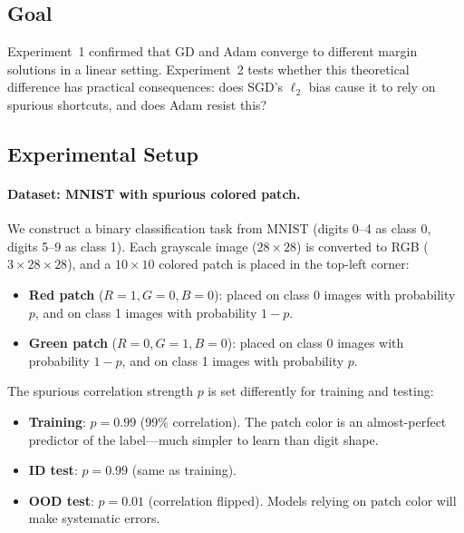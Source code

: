 \documentclass{article}
\begin{document}
\subsection{Goal}

Experiment~1 confirmed that GD and Adam converge to different margin solutions in a linear setting. Experiment~2 tests whether this theoretical difference has practical consequences: does SGD's $\ell_2$ bias cause it to rely on spurious shortcuts, and does Adam resist this?

\subsection{Experimental Setup}

\paragraph{Dataset: MNIST with spurious colored patch.} We construct a binary classification task from MNIST (digits 0--4 as class 0, digits 5--9 as class 1). Each grayscale image ($28 \times 28$) is converted to RGB ($3 \times 28 \times 28$), and a $10 \times 10$ colored patch is placed in the top-left corner:
\begin{itemize}[leftmargin=*]
    \item \textbf{Red patch} ($R=1, G=0, B=0$): placed on class 0 images with probability $p$, and on class 1 images with probability $1-p$.
    \item \textbf{Green patch} ($R=0, G=1, B=0$): placed on class 0 images with probability $1-p$, and on class 1 images with probability $p$.
\end{itemize}

The spurious correlation strength $p$ is set differently for training and testing:
\begin{itemize}[leftmargin=*]
    \item \textbf{Training}: $p = 0.99$ (99\% correlation). The patch color is an almost-perfect predictor of the label---much simpler to learn than digit shape.
    \item \textbf{ID test}: $p = 0.99$ (same as training).
    \item \textbf{OOD test}: $p = 0.01$ (correlation flipped). Models relying on patch color will make systematic errors.
\end{itemize}
\end{document}
